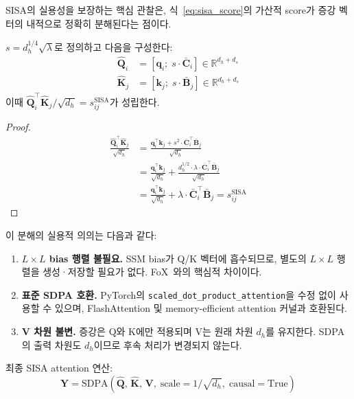 \documentclass[11pt]{article}
\begin{document}
SISA의 실용성을 보장하는 핵심 관찰은, 식~\eqref{eq:sisa_score}의 가산적 score가 증강 벡터의 내적으로 정확히 분해된다는 점이다.

\begin{proposition}
\label{prop:decomposition}
$s = d_h^{1/4}\sqrt{\lambda}$로 정의하고 다음을 구성한다:
\begin{align}
\hat{\mathbf{Q}}_i &= [\mathbf{q}_i;\; s \cdot \bar{\mathbf{C}}_i] \in \mathbb{R}^{d_h + d_s} \\
\hat{\mathbf{K}}_j &= [\mathbf{k}_j;\; s \cdot \bar{\mathbf{B}}_j] \in \mathbb{R}^{d_h + d_s}
\end{align}
이때 $\hat{\mathbf{Q}}_i^\top \hat{\mathbf{K}}_j / \sqrt{d_h} = s_{ij}^{\text{SISA}}$가 성립한다.
\end{proposition}

\begin{proof}
\begin{align}
\frac{\hat{\mathbf{Q}}_i^\top \hat{\mathbf{K}}_j}{\sqrt{d_h}} &= \frac{\mathbf{q}_i^\top \mathbf{k}_j + s^2 \cdot \bar{\mathbf{C}}_i^\top \bar{\mathbf{B}}_j}{\sqrt{d_h}} \\
&= \frac{\mathbf{q}_i^\top \mathbf{k}_j}{\sqrt{d_h}} + \frac{d_h^{1/2} \cdot \lambda \cdot \bar{\mathbf{C}}_i^\top \bar{\mathbf{B}}_j}{\sqrt{d_h}} \\
&= \frac{\mathbf{q}_i^\top \mathbf{k}_j}{\sqrt{d_h}} + \lambda \cdot \bar{\mathbf{C}}_i^\top \bar{\mathbf{B}}_j = s_{ij}^{\text{SISA}}
\end{align}
\end{proof}

이 분해의 실용적 의의는 다음과 같다:
\begin{enumerate}[leftmargin=*]
\item \textbf{$L \times L$ bias 행렬 불필요.} SSM bias가 Q/K 벡터에 흡수되므로, 별도의 $L \times L$ 행렬을 생성·저장할 필요가 없다. FoX~\citep{fox}와의 핵심적 차이이다.
\item \textbf{표준 SDPA 호환.} PyTorch의 \texttt{scaled\_dot\_product\_attention}을 수정 없이 사용할 수 있으며, FlashAttention 및 memory-efficient attention 커널과 호환된다.
\item \textbf{V 차원 불변.} 증강은 Q와 K에만 적용되며 V는 원래 차원 $d_h$를 유지한다. SDPA의 출력 차원도 $d_h$이므로 후속 처리가 변경되지 않는다.
\end{enumerate}

최종 SISA attention 연산:
\begin{equation}
\mathbf{Y} = \text{SDPA}(\hat{\mathbf{Q}},\, \hat{\mathbf{K}},\, \mathbf{V},\;\text{scale}=1/\sqrt{d_h},\;\text{causal}=\text{True})
\end{equation}
\end{document}
